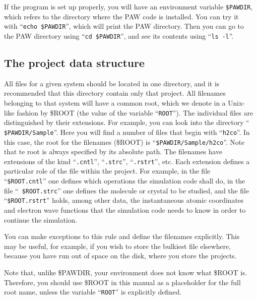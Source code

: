 \documentclass[final,12pt]{article}
\begin{document}
If the program is set up properly, you will have an
environment variable {\tt \$PAWDIR}, which refers to the directory
where the PAW code is installed. You can try it with ``{\tt echo
  \$PAWDIR}'', which will print the PAW directory. Then you can go to
the PAW directory using ``{\tt cd \$PAWDIR}'', and see its contents
using ``{\tt ls -l}''.


\subsection{The project data structure}
\label{ROOT}
\begin{sloppypar}
All files for a given system should be located in one directory, and
it is recommended that this directory contain only that project.  All
filenames belonging to that system will have a common root, which we
denote in a Unix-like fashion by \$ROOT (the value of the variable
``{\tt ROOT}''). The individual files are distinguished by their
extensions. For example, you can look into the directory ``{\tt
  \$PAWDIR/Sample}''. Here you will find a number of files that begin
with ``{\tt h2co}''. In this case, the root for the filenames (\$ROOT)
is ``{\tt \$PAWDIR/Sample/h2co}''. Note that te root is always
specified by its absolute path. The filenames have extensions of the
kind ``{\tt .cntl}'', ``{\tt .strc}'', ``{\tt .rstrt}'', etc.  Each
extension defines a particular role of the file within the project.
For example, in the file ``{\tt \$ROOT.cntl}'' one defines which
operations the simulation code shall do, in the file ``{\tt
  \$ROOT.strc}'' one defines the molecule or crystal to be studied,
and the file ``{\tt \$ROOT.rstrt}'' holds, among other data, the
instantaneous atomic coordinates and electron wave functions that the
simulation code needs to know in order to continue the simulation.
\end{sloppypar}

You can make exceptions to this rule and define the filenames
explicitly. This may be useful, for example, if you wish to store the
bulkiest file elsewhere, because you have run out of space on the
disk, where you store the projects.

Note that, unlike \$PAWDIR, your environment does not know what \$ROOT
is. Therefore, you should use \$ROOT in this manual as a placeholder for
the full root name, unless the variable ``{\tt ROOT}'' is
explicitly defined. 
\end{document}
